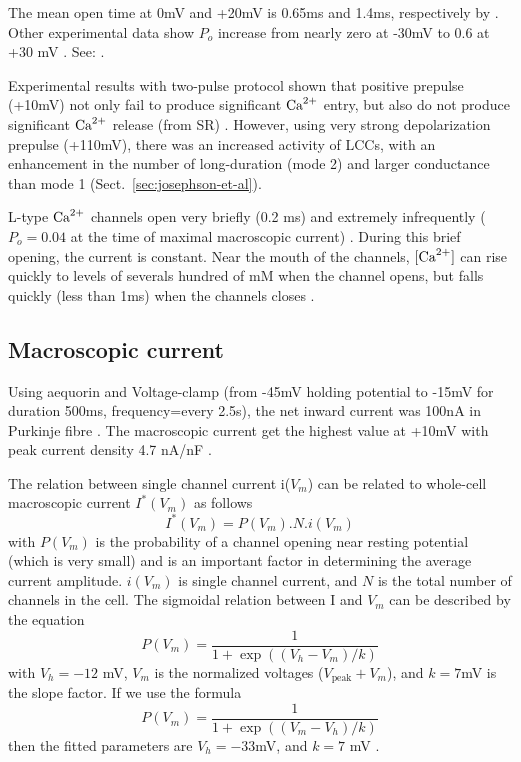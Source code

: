 The mean open time at 0mV and +20mV is 0.65ms and 1.4ms, respectively by
\citep{fenwick1982}. Other experimental data show $P_o$ increase from nearly
zero at -30mV to 0.6 at +30 mV \citep{reuter1982}. See: \citep{sun2000mlc}.

\begin{framed}
Experimental results with two-pulse protocol shown that
positive prepulse (+10mV) not only fail to produce significant ${\text{Ca}^{2+}}$
entry, but also do not produce significant ${\text{Ca}^{2+}}$ release (from SR)
\citep{lee1985icc}. However, using very strong depolarization prepulse
(+110mV), there was an increased activity of LCCs, with an enhancement
in the number of long-duration (mode 2) \citep{josephson2002mgu} and
larger conductance than mode 1 \citep{josephson2002mcu}
(Sect.~\ref{sec:josephson-et-al}).
\end{framed}

L-type ${\text{Ca}^{2+}}$ channels open very briefly (0.2 ms) and extremely infrequently
($P_o=0.04$ at the time of maximal macroscopic current) \citep{mazzanti1990,
rose1992}. During this brief opening, the current is constant. Near the mouth of
the channels, $[{\text{Ca}^{2+}}]$ can rise quickly to levels of severals hundred of mM when
the channel opens, but falls quickly (less than 1ms) when the channels closes
\citep{bers1991}. 




\subsection{Macroscopic current}
\label{sec:IcaL_macroscopic}

Using aequorin and Voltage-clamp (from -45mV holding potential to -15mV for
duration 500ms, frequency=every 2.5s), the net inward current was 100nA in
Purkinje fibre \citep{wier1982}. The macroscopic current get the highest value
at +10mV with peak current density 4.7 nA/nF \citep{rose1992}.

The relation between single channel current i($V_m$) can be related to
whole-cell macroscopic current $I^*(V_m)$ as follows
\begin{equation}
I^*(V_m)=P(V_m).N.i(V_m)
\end{equation}
with $P(V_m)$ is the probability of a channel opening near resting potential
(which is very small) and is an important factor in determining the average
current amplitude. $i(V_m)$ is single channel current, and $N$ is the total
number of channels in the cell. The sigmoidal relation between I and $V_m$ can
be described by the equation
\begin{equation}
P(V_m) = \frac{1}{1+ \exp\left((V_h-V_m)/k \right)}
\end{equation}
with $V_h=-12$ mV, $V_m$ is the normalized voltages ($V_\text{peak}+V_m$), and
$k=7$mV is the slope factor. 
If we use the formula
\begin{equation}
P(V_m) = \frac{1}{1+ \exp\left((V_m-V_h)/k \right)}
\end{equation}
then the fitted parameters are $V_h=-33$mV, and $k=7$ mV \citep{mcdonald1986}. 

